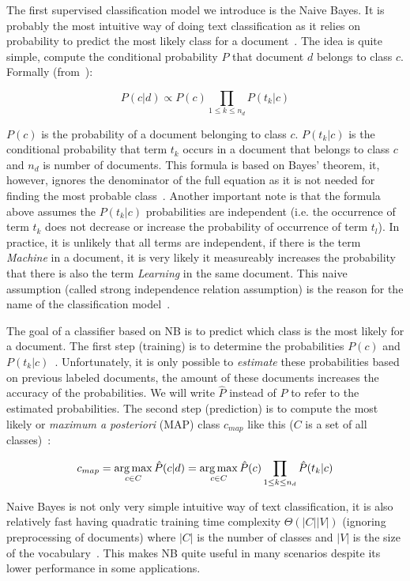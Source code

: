 The first supervised classification model we introduce is the Naive Bayes. It is probably the most intuitive way of doing text classification as it relies on probability to predict the most likely class for a document~\cite{manning2008introduction}. The idea is quite simple, compute the conditional probability $P$ that document $d$ belongs to class $c$. Formally (from~\cite{manning2008introduction}):

$$P(c|d) \propto P(c) \prod_{1 \leq k \leq n_d} P(t_k|c)$$

$P(c)$ is the probability of a document belonging to class $c$. $P(t_k|c)$ is the conditional probability that term $t_k$ occurs in a document that belongs to class $c$ and $n_d$ is number of documents. This formula is based on Bayes' theorem, it, however, ignores the denominator of the full equation as it is not needed for finding the most probable class~\cite{hand2001bayes}. Another important note is that the formula above assumes the $P(t_k|c)$ probabilities are independent (i.e. the occurrence of term $t_k$ does not decrease or increase the probability of occurrence of term $t_l$). In practice, it is unlikely that all terms are independent, if there is the term \textit{Machine} in a document, it is very likely it measureably increases the probability that there is also the term \textit{Learning} in the same document. This naive assumption (called strong independence relation assumption) is the reason for the name of the classification model~\cite{hand2001bayes}.

The goal of a classifier based on NB is to predict which class is the most likely for a document. The first step (training) is to determine the probabilities $P(c)$ and $P(t_k|c)$~\cite{manning2008introduction}. Unfortunately, it is only possible to \textit{estimate} these probabilities based on previous labeled documents, the amount of these documents increases the accuracy of the probabilities. We will write $\hat{P}$ instead of $P$ to refer to the estimated probabilities. The second step (prediction) is to compute the most likely or \textit{maximum a posteriori} (MAP) class $c_{map}$ like this ($C$ is a set of all classes)~\cite{manning2008introduction}:

$$c_{map} = \operatorname*{arg\,max}_{c \in C} \hat{P}(c|d) = \operatorname*{arg\,max}_{c \in C} \hat{P}(c) \prod_{1 \leq k \leq n_d} \hat{P}(t_k|c)$$

Naive Bayes is not only very simple intuitive way of text classification, it is also relatively fast having quadratic training time complexity $\Theta(|C||V|)$ (ignoring preprocessing of documents) where $|C|$ is the number of classes and $|V|$ is the size of the vocabulary~\cite{manning2008introduction}. This makes NB quite useful in many scenarios despite its lower performance in some applications.

